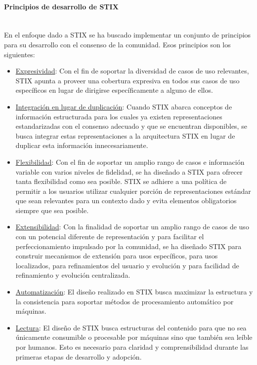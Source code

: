 \paragraph{Principios de desarrollo de STIX}\ \\
En el enfoque dado a STIX se ha buscado implementar un conjunto de principios 
para su desarrollo con el consenso de la comunidad. Esos principios son los siguientes:
\begin{itemize}
  \item \underline{Expresividad}: Con el fin de soportar la diversidad de casos de uso relevantes, STIX apunta a 
proveer una cobertura expresiva en todos sus casos de uso específicos en lugar 
de dirigirse específicamente a alguno de ellos.
  \item \underline{Integración en lugar de duplicación}: Cuando STIX abarca conceptos de información estructurada para los cuales ya 
existen representaciones estandarizadas con el consenso adecuado y que se 
encuentran disponibles, se busca integrar estas representaciones a la 
arquitectura STIX en lugar de duplicar esta información innecesariamente.
\item \underline{Flexibilidad}: Con el fin de soportar un amplio rango de casos e información variable con 
varios niveles de fidelidad, se ha diseñado a STIX para ofrecer tanta flexibilidad 
como sea posible. STIX se adhiere a una política de permitir a los usuarios 
utilizar cualquier porción de representaciones estándar que sean relevantes para 
un contexto dado y evita elementos obligatorios siempre que sea posible.
\item \underline{Extensibilidad}: Con la finalidad de soportar un amplio rango de casos de uso con un potencial 
diferente de representación y para facilitar el perfeccionamiento 
impulsado por la comunidad, se ha diseñado STIX para construir mecanismos de 
extensión para usos específicos, para usos localizados, para refinamientos del 
usuario y evolución y para facilidad de refinamiento y evolución centralizada.
\item \underline{Automatización}: El diseño realizado en STIX busca maximizar la estructura y la consistencia para 
soportar métodos de procesamiento automático por máquinas.
\item \underline{Lectura}: El diseño de STIX busca estructuras del contenido para que no sea únicamente 
consumible o procesable por máquinas sino que también sea leíble por humanos. 
Esto es necesario para claridad y comprensibilidad durante las primeras etapas 
de desarrollo y adopción.

\end{itemize}
